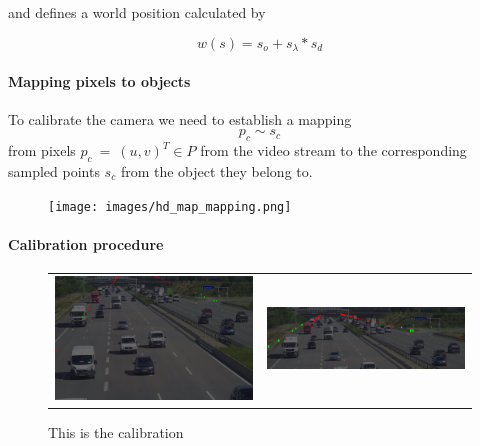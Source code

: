and defines a world position calculated by

\begin{equation}
  w(s) = s_o + s_\lambda * s_d
  \end{equation}

\paragraph{Mapping pixels to objects}

To calibrate the camera we need to establish a mapping
\begin{equation}
  p_c \sim s_c
\end{equation}
from pixels $p_c~=~(u,v)^T \in P$ from the video stream to the corresponding sampled points $s_c$ from the object they belong to.

\begin{figure}[t]
  \begin{center}
     \texttt{[image: images/hd\_map\_mapping.png]}
  \end{center}
     \caption{}
  \label{fig:hd_map_mapping}
  \end{figure}

\paragraph{Calibration procedure}

\begin{figure}[t]
  \begin{tabular}{cc}
    \includegraphics[width=0.5\linewidth]{images/calibration/background_uncalibrated.png}    &  
    \includegraphics[width=0.5\linewidth]{images/calibration/background_calibrated.png}    
  \end{tabular}
  \caption{This is the calibration}
  \label{fig:calibration}
  \end{figure}
  
